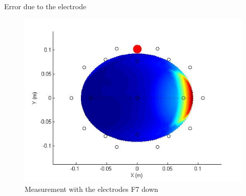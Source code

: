 \documentclass[t,12pt,english
\ifx\beamermode\undefined\else,\beamermode\fi
]{beamer}
\begin{document}
\begin{frame}{Error due to the electrode}
\begin{figure}[!htbp]
\includegraphics[width=1\textwidth]{21.jpg}\\
\tiny{Measurement with the electrodes F7 down}
\endminipage\hfill
\end{figure}


\end{frame}
\end{document}
